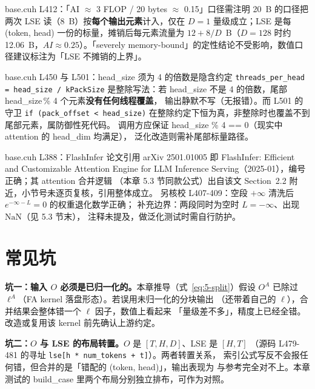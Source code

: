 \begin{kaogu}[F4]{base.cuh L412：「AI $\approx$ 3 FLOP / 20 bytes $\approx$ 0.15」口径需注明}
  20~B 的口径把两次 LSE 读（8~B）按\textbf{每个输出元素}计入，仅在
  $D = 1$ 量级成立；LSE 是每 (token, head) 一份的标量，摊销后每元素流量为
  $12 + 8/D$~B（$D = 128$ 时约 12.06~B，$AI \approx 0.25$）。「severely
  memory-bound」的定性结论不受影响，数值口径建议标注为「LSE 不摊销的上界」。
\end{kaogu}

\begin{kaogu}[F3]{base.cuh L450 与 L501：head\_size 须为 4 的倍数是隐含约定}
  \texttt{threads\_\allowbreak{}per\_\allowbreak{}head =\allowbreak{} head\_\allowbreak{}size /\allowbreak{} k\allowbreak{}Pack\allowbreak{}Size} 是整除写法：若
  head\_size 不是 4 的倍数，尾部 head\_size\,\% 4 个元素\textbf{没有任何线程覆盖}，
  输出静默不写（无报错）。而 L501 的守卫 \texttt{if \allowbreak{}(pack\_\allowbreak{}offset \allowbreak{}< head\_\allowbreak{}size)}
  在整除约定下恒为真，非整除时也覆盖不到尾部元素，属防御性死代码。
  调用方应保证 head\_size \% 4 == 0（现实中 attention 的 head\_dim 均满足），
  泛化改造则需补尾部标量路径。
\end{kaogu}

\begin{kaogu}[F5 核校通过]{base.cuh L388：FlashInfer 论文引用}
  arXiv 2501.01005 即 FlashInfer: Efficient and Customizable Attention Engine
  for LLM Inference Serving（2025-01），编号正确；其 attention 合并逻辑
  （本章 5.3 节同款公式）出自该文 Section~2.2 附近，小节号未逐页复核，引用整体成立。
  另核校 L407-409：空段 $+\infty$ 清洗后 $e^{-\infty - L} = 0$ 的权重退化数学正确；
  补充边界：两段同时为空时 $L = -\infty$、出现 $\mathrm{NaN}$（见 5.3 节末），
  注释未提及，做泛化测试时需自行防护。
\end{kaogu}

\section{常见坑}

\textbf{坑一：输入 $O$ 必须是已归一化的。}本章推导（式~\ref{eq:5-split}）假设
$O^{A}$ 已除过 $\ell^{A}$（FA kernel 落盘形态）。若误用未归一化的分块输出
（还带着自己的 $\ell$），合并结果会整体错一个 $\ell$ 因子，数值上看起来
「量级差不多」，精度上已经全错。改造或复用该 kernel 前先确认上游约定。

\textbf{坑二：$O$ 与 LSE 的布局转置。}$O$ 是 $[T, H, D]$、LSE 是 $[H, T]$
（源码 L479-481 的寻址 \texttt{lse[h * num\_tokens + t]}）。两者转置关系，
索引公式写反不会报任何错，但合并的是「错配的 (token, head)」，输出表现为
与参考完全对不上。本章测试的 build\_case 里两个布局分别独立排布，可作为对照。

